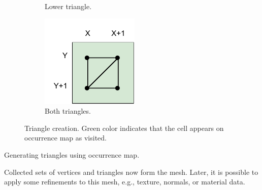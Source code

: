 \begin{figure}[ht]
\begin{subfigure}{0.3\textwidth}
        \caption{Lower triangle.}
        \label{fig:triangle_generation:lower}
    \end{subfigure}
    \begin{subfigure}{0.3\textwidth}
        \includegraphics[width=\textwidth]{triangles-full.pdf}
        \caption{Both triangles.}
    \end{subfigure}
    
    \caption{Triangle creation. Green color indicates that the cell appears on occurrence map as visited.}
    \label{fig:triangle_generation}
\end{figure}

\begin{algorithm}
    \caption{Generating triangles using occurrence map.}

\end{algorithm}

Collected sets of vertices and triangles now form the mesh. Later, it is possible to apply some refinements to this mesh, e.g., texture, normals, or material data.

